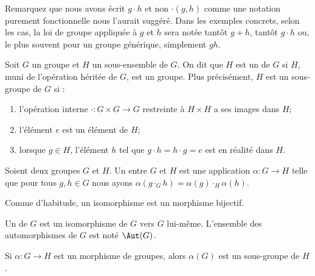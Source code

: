 \begin{remark}\label{REMooNotationOperationGroupe}
	Remarquez que nous avons écrit \( g\cdot h\) et non \( \cdot(g,h)\) comme une notation purement fonctionnelle nous l'aurait suggéré. Dans les exemples concrets, selon les cas, la loi de groupe appliquée à \( g\) et \( h\) sera notée tantôt \( g+h\), tantôt \( g\cdot h\) ou, le plus souvent pour un groupe générique, simplement \( gh\).
\end{remark}

\begin{definition}    \label{DEFooSousGroupe}
	Soit \( G \) un groupe et \( H \) un sous-ensemble de \( G \). On dit que \( H \) est un  de \( G \) si \( H \), muni de l'opération héritée de \(G \), est un groupe. Plus précisément, \( H \) est un sous-groupe de \( G \) si :
	\begin{enumerate}
		\item
		      l'opération interne \( \cdot\colon G\times G\to G\) restreinte à \( H \times H \) a ses images dans \( H \);
		\item
		      l'élément \( e \) est un élément de \( H \);
		\item
		      lorsque \( g  \in H \), l'élément \( h \) tel que \(g\cdot h=h\cdot g=e \) est en réalité dans \( H \).
	\end{enumerate}
\end{definition}

\begin{definition}        \label{DEFooBEHTooMeCOTX}
	Soient deux groupes \( G\) et \( H\). Un  entre \( G\) et \( H\) est une application \( \alpha\colon G\to H\) telle que pour tous \( g,h\in G\) nous ayons \( \alpha(g\cdot_Gh)=\alpha(g)\cdot_H\alpha(h)\).

	Comme d'habitude, un isomorphisme est un morphisme bijectif.

	Un  de \( G\) est un isomorphisme de \( G\) vers \( G\) lui-même. L'ensemble des automorphismes de \( G\) est noté \( \Aut(G)\).
\end{definition}

\begin{proposition}		\label{PROPooJHHPooIpciPA}
	Si \(\alpha \colon G\to H  \) est un morphisme de groupes, alors \( \alpha(G)\) est un sous-groupe de \( H\).
\end{proposition}

